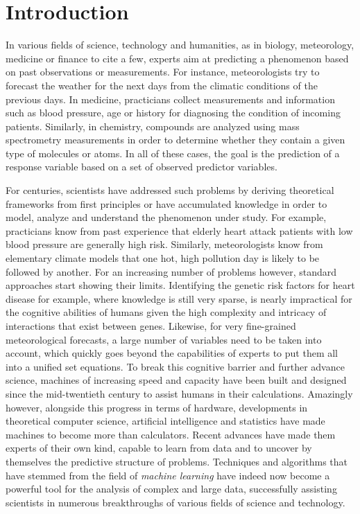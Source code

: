 \chapter{Introduction}\label{ch:introduction}

In various fields of science, technology and humanities, as in biology,
meteorology, medicine or finance to cite a few, experts aim at predicting a
phenomenon based on past observations or measurements. For instance,
meteorologists try to forecast the weather for the next days from the climatic
conditions of the previous days. In medicine, practicians collect measurements
and information such as blood pressure, age or history for diagnosing the
condition of incoming patients. Similarly, in chemistry, compounds are analyzed
using mass spectrometry measurements in order to determine whether they contain
a given type of molecules or atoms. In all of these cases, the goal is
the prediction of a response variable based on a set of observed predictor
variables.

For centuries, scientists have addressed such problems by deriving
theoretical frameworks from first principles or have accumulated knowledge in
order to model, analyze and understand the pheno\-menon under study. For
example, practicians know from past experience that elderly heart attack
patients with low blood pressure are generally high risk. Similarly,
meteorologists know from elementary climate models that one hot, high pollution
day is likely to be followed by another. For an increasing number of problems
however, standard approaches start showing their limits. Identifying the
genetic risk factors for heart disease for example, where knowledge is still
very sparse, is nearly impractical for the cognitive abilities of humans given
the high complexity and intricacy of interactions that exist between genes.
Likewise, for very fine-grained meteorological forecasts, a large number of
variables need to be taken into account, which quickly goes beyond the
capabilities of experts to put them all into a unified set equations. To break
this cognitive barrier and further advance science, machines of increasing
speed and capacity have been built and designed since the mid-twentieth century
to assist humans in their calculations. Amazingly however, alongside this progress in
terms of hardware, developments in theoretical computer science, artificial
intelligence and statistics have made machines to become more than calculators.
Recent advances have made them experts of their own kind, capable to learn from
data and to uncover by themselves the predictive structure of problems.
Techniques and algorithms that have stemmed from the field of {\it machine
learning} have indeed now become a powerful tool for the analysis of complex and large
data, successfully assisting scientists in numerous breakthroughs of various
fields of science and technology.

